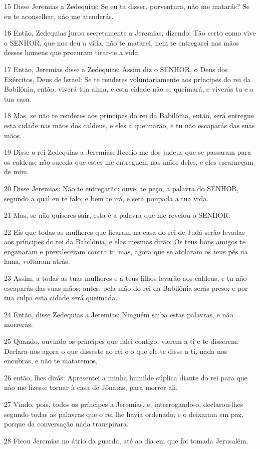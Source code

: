 \par 15 Disse Jeremias a Zedequias: Se eu ta disser, porventura, não me matarás? Se eu te aconselhar, não me atenderás.
\par 16 Então, Zedequias jurou secretamente a Jeremias, dizendo: Tão certo como vive o SENHOR, que nos deu a vida, não te matarei, nem te entregarei nas mãos desses homens que procuram tirar-te a vida.
\par 17 Então, Jeremias disse a Zedequias: Assim diz o SENHOR, o Deus dos Exércitos, Deus de Israel: Se te renderes voluntariamente aos príncipes do rei da Babilônia, então, viverá tua alma, e esta cidade não se queimará, e viverás tu e a tua casa.
\par 18 Mas, se não te renderes aos príncipes do rei da Babilônia, então, será entregue esta cidade nas mãos dos caldeus, e eles a queimarão, e tu não escaparás das suas mãos.
\par 19 Disse o rei Zedequias a Jeremias: Receio-me dos judeus que se passaram para os caldeus; não suceda que estes me entreguem nas mãos deles, e eles escarneçam de mim.
\par 20 Disse Jeremias: Não te entregarão; ouve, te peço, a palavra do SENHOR, segundo a qual eu te falo; e bem te irá, e será poupada a tua vida.
\par 21 Mas, se não quiseres sair, esta é a palavra que me revelou o SENHOR:
\par 22 Eis que todas as mulheres que ficaram na casa do rei de Judá serão levadas aos príncipes do rei da Babilônia, e elas mesmas dirão: Os teus bons amigos te enganaram e prevaleceram contra ti; mas, agora que se atolaram os teus pés na lama, voltaram atrás.
\par 23 Assim, a todas as tuas mulheres e a teus filhos levarão aos caldeus, e tu não escaparás das suas mãos; antes, pela mão do rei da Babilônia serás preso; e por tua culpa esta cidade será queimada.
\par 24 Então, disse Zedequias a Jeremias: Ninguém saiba estas palavras, e não morrerás.
\par 25 Quando, ouvindo os príncipes que falei contigo, vierem a ti e te disserem: Declara-nos agora o que disseste ao rei e o que ele te disse a ti, nada nos encubras, e não te mataremos,
\par 26 então, lhes dirás: Apresentei a minha humilde súplica diante do rei para que não me fizesse tornar à casa de Jônatas, para morrer ali.
\par 27 Vindo, pois, todos os príncipes a Jeremias, e, interrogando-o, declarou-lhes segundo todas as palavras que o rei lhe havia ordenado; e o deixaram em paz, porque da conversação nada transpirara.
\par 28 Ficou Jeremias no átrio da guarda, até ao dia em que foi tomada Jerusalém.

